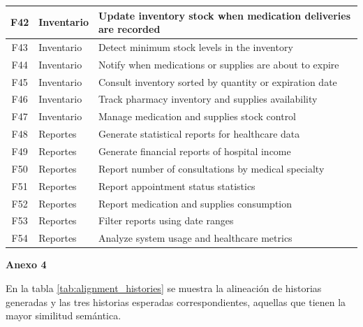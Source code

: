 \documentclass{prgrado}
\begin{document}
\begin{longtable}{|c|l|p{9cm}|}
F42 & Inventario & Update inventory stock when medication deliveries are recorded \\ \hline
F43 & Inventario & Detect minimum stock levels in the inventory \\ \hline
F44 & Inventario & Notify when medications or supplies are about to expire \\ \hline
F45 & Inventario & Consult inventory sorted by quantity or expiration date \\ \hline
F46 & Inventario & Track pharmacy inventory and supplies availability \\ \hline
F47 & Inventario & Manage medication and supplies stock control \\ \hline
F48 & Reportes & Generate statistical reports for healthcare data \\ \hline
F49 & Reportes & Generate financial reports of hospital income \\ \hline
F50 & Reportes & Report number of consultations by medical specialty \\ \hline
F51 & Reportes & Report appointment status statistics \\ \hline
F52 & Reportes & Report medication and supplies consumption \\ \hline
F53 & Reportes & Filter reports using date ranges \\ \hline
F54 & Reportes & Analyze system usage and healthcare metrics \\ \hline

\end{longtable}




\newpage
\vspace{0.75\baselineskip}
{\large\bfseries Anexo 4\par}
\vspace{0.25\baselineskip}

En la tabla \ref{tab:alignment_histories} se muestra la alineación de historias generadas y las tres historias esperadas correspondientes, aquellas que tienen la mayor similitud semántica.
\end{document}
